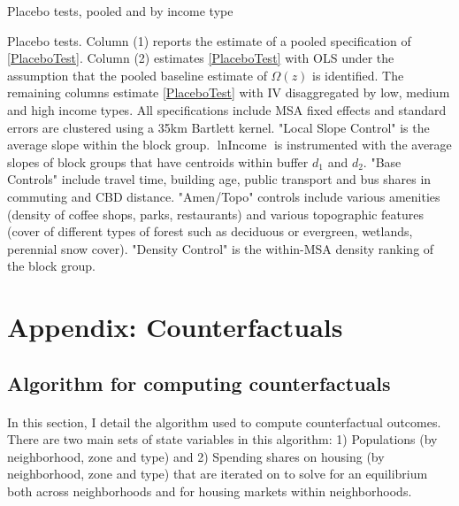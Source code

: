 \documentclass[12pt]{article}
\begin{document}
	\clearpage
	
	\begin{landscape}
	\begin{table}[h]
		\caption{Placebo tests, pooled and by income type}\label{table:PlaceboTest}
		\makebox[\linewidth]{}
		\caption*{Placebo tests. Column (1) reports the estimate of a pooled specification of \eqref{PlaceboTest}. Column (2) estimates \eqref{PlaceboTest} with OLS under the assumption that the pooled baseline estimate of $\Omega(z)$ is identified. The remaining columns estimate \eqref{PlaceboTest} with IV disaggregated by low, medium and high income types. All specifications include MSA fixed effects and standard errors are clustered using a 35km Bartlett kernel. "Local Slope Control" is the average slope within the block group. $\ln \text{Income}$ is instrumented with the average slopes of block groups that have centroids within buffer $d_{1}$ and $d_{2}$. "Base Controls" include travel time, building age, public transport and bus shares in commuting and CBD distance. "Amen/Topo" controls include various amenities (density of coffee shops, parks, restaurants) and various topographic features (cover of different types of forest such as deciduous or evergreen, wetlands, perennial snow cover). "Density Control" is the within-MSA density ranking of the block group.}
	\end{table}
	\end{landscape}
	
	
	\clearpage
	
	
	\section{Appendix: Counterfactuals}
	
	\subsection{Algorithm for computing counterfactuals}\label{Appendix:CounterfactualComputation}
	
	\paragraph*{}
	In this section, I detail the algorithm used to compute counterfactual outcomes. There are two main sets of state variables in this algorithm: 1) Populations (by neighborhood, zone and type) and 2) Spending shares on housing (by neighborhood, zone and type) that are iterated on to solve for an equilibrium both across neighborhoods and for housing markets within neighborhoods.
	
\end{document}
